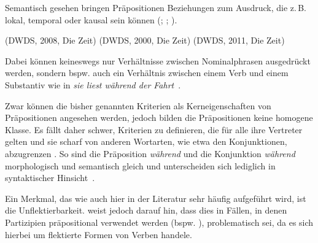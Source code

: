 Semantisch gesehen bringen Präpositionen Beziehungen zum Ausdruck, die z.\,B. lokal, temporal oder kausal sein können (\citealp[ausführlich dazu][]{Eroms1981}; \citealp[s. außerdem][365--366]{Jung1980}; \citealp[51--53, 55]{Rauh1990}). 
\begin{exe}
\ex {} (DWDS, 2008, Die Zeit)
\ex {} (DWDS, 2000, Die Zeit) 
\ex {} (DWDS, 2011, Die Zeit)
\end{exe}
Dabei können keineswegs nur Verhältnisse zwischen Nominalphrasen ausgedrückt werden, sondern bspw. auch ein Verh{\"a}ltnis zwischen einem Verb und einem Substantiv wie in \textit{sie liest w{\"a}hrend der Fahrt}~\citep[s.][41]{Romare.2004}.

Zwar können die bisher genannten Kriterien als Kerneigenschaften von Präpositionen angesehen werden, jedoch bilden die Präpositionen keine homogene Klasse.
Es fällt daher schwer, Kriterien zu definieren, die für alle ihre Vertreter gelten und sie scharf von anderen Wortarten, wie etwa den Konjunktionen, abzugrenzen \citep[s.][264]{Lindqvist1994}. 
So sind die Pr{\"a}position \textit{w{\"a}hrend }und die Konjunktion \textit{w{\"a}hrend }morphologisch und semantisch gleich und unterscheiden sich lediglich in syntaktischer Hinsicht~\citep[s.][39]{Romare.2004}.

Ein Merkmal, das wie auch hier in der Literatur sehr h{\"a}ufig aufgef{\"u}hrt wird, ist die Unflektierbarkeit. 
\citet[10--11]{Lindqvist1994} weist jedoch darauf hin, dass dies in F{\"a}llen, in denen Partizipien pr{\"a}positional verwendet werden (bspw. ), problematisch sei, da es sich hierbei um flektierte Formen von Verben handele. 

